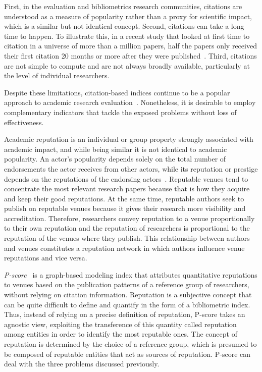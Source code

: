 \documentclass[notitlepage]{svjour3}
\begin{document}
First, in the evaluation and bibliometrics research communities, citations are understood
as a measure of popularity rather than a proxy for scientific impact, which is a similar but not
identical concept.
Second, citations can take a long time to happen. To illustrate this, in a recent
study that looked at first time to citation in a universe of more than a million papers, half the 
papers only received their first citation 20 months or more after they were
published~\cite{Nane2012}. Third, citations are not simple to compute and are not always broadly
available, particularly at the level of individual researchers.

Despite these limitations, citation-based indices continue to be a popular approach to
academic research evaluation~\cite{Kellner2008}.
Nonetheless, it is desirable to employ
complementary indicators that tackle the exposed problems without loss of effectiveness.

Academic reputation is an individual or group property strongly associated with 
academic impact, and while being similar it is not identical to academic popularity. An 
actor's popularity depends solely on the total number of endorsements
the actor receives from other actors, while its reputation or prestige depends on the 
reputations of the endorsing actors~\cite{Bollen2006}. Reputable venues tend to 
concentrate the most relevant research papers 
because that is how they acquire and keep their good reputations. At the same time, 
reputable authors seek to publish on reputable venues because it gives their 
research more visibility and accreditation. Therefore, researchers convey reputation
to a venue proportionally to their own reputation and the reputation of researchers
is proportional to the reputation of the venues where they publish.
This relationship between authors and venues constitutes a reputation network in which 
authors influence venue reputations and vice versa. 

{\em P-score}~\cite{Ribas2015a} is a graph-based modeling index that attributes quantitative
reputations to venues based on the publication patterns of a reference group of researchers,
without relying on citation information. Reputation is a subjective concept that can be 
quite difficult to define and quantify in the form of a bibliometric index. Thus,
instead of relying on a precise definition of reputation, P-score takes an agnostic 
view, exploiting the transference of this quantity called reputation among entities in order 
to identify the most reputable ones. The concept of reputation is determined by the choice of 
a reference group, which is presumed to be composed of reputable entities that act as sources
of reputation. P-score can deal with the three problems discussed previously. 
\end{document}
